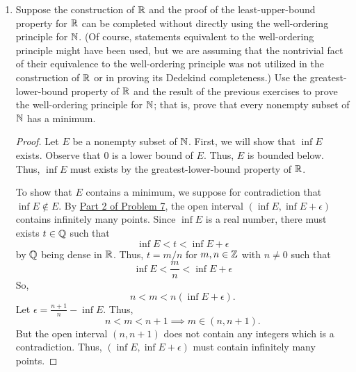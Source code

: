\documentclass[11pt,a4paper]{article}
\begin{document}
\begin{enumerate}
\begin{enumerate}
\begin{proof}
    Now, we will show, through contradiction, that \( (\inf B, \inf B + \epsilon) \cap B \) contains infinitely many points. Suppose there exists an \( \epsilon > 0  \) such that \( (\inf B, \inf B + \epsilon) \) FINITELY many points. Denote these points by \( {b}_{i}  \) for \( 1 \leq i \leq n  \) in
    \[  (\inf B, \inf B + \epsilon) \cap B = \{ {b}_{i} : 1 \leq i \leq n   \}  \]
    For all \( 1 \leq k \leq n  \), let \( {d}_{k } = | \inf B - {b}_{k } |  \). Since \( {b}_{k } \in B  \) and \( \inf B \notin  B  \), we must have \( | \inf B - {b}_{k } | > 0  \). Let 
    \[  d = \frac{ \min \{ {d}_{1}, {d}_{2}, \dots, {d}_{n} \}  }{ 2 }. \]
    But this implies that none of the \( {b}_{i} \) for \( 1 \leq i \leq n   \) lies within the open interval \( (\inf B , \inf B + \epsilon) \). That is, the set 
    \[  (\inf B , \inf B + \epsilon) \cap B = \emptyset \]
    which is a contradiction. Thus, the open interval \( (\inf B, \inf B + \epsilon) \) must have infinitely many points.
    \end{proof}
\end{enumerate}

\item Suppose the construction of \( \mathbb{R}  \) and the proof of the least-upper-bound property for \( \mathbb{R}  \) can be completed without directly using the well-ordering principle for \( \mathbb{N}  \). (Of course, statements equivalent to the well-ordering principle might have been used, but we are assuming that the nontrivial fact of their equivalence to the well-ordering principle was not utilized in the construction of \( \mathbb{R}  \) or in proving its Dedekind completeness.) Use the greatest-lower-bound property of \( \mathbb{R}  \) and the result of the previous exercises to prove the well-ordering principle for \( \mathbb{N}  \); that is, prove that every nonempty subset of \( \mathbb{N}  \) has a minimum.
    \begin{proof}
    Let \( E  \) be a nonempty subset of \( \mathbb{N}  \). First, we will show that \( \inf E  \) exists. Observe that \( 0  \) is a lower bound of \( E  \). Thus, \( E  \) is bounded below. Thus, \( \inf E  \) must exists by the greatest-lower-bound property of \( \mathbb{R}  \).    

    To show that \( E  \) contains a minimum, we suppose for contradiction that \( \inf E \notin E  \). By {\hyperref[Problem 2]{Part 2 of Problem 7}}, the open interval \( (\inf E, \inf E + \epsilon) \) contains infinitely many points. Since \( \inf E  \) is a real number, there must exists \( t \in \mathbb{Q}  \) such that    
    \[  \inf E < t < \inf E + \epsilon \]
    by \( \mathbb{Q}  \) being dense in \( \mathbb{R}  \).
    Thus, \( t = m / n  \) for \( m, n \in \mathbb{Z}  \) with \( n \neq 0  \) such that  
    \[  \inf E < \frac{ m }{ n }  < \inf E + \epsilon   \]
    So,
    \[ n < m <  n (\inf E + \epsilon). \]
    Let \( \epsilon = \frac{ n + 1 }{ n }  - \inf E  \). Thus,     
    \[  n < m < n + 1 \implies m \in (n, n +1).  \]
    But the open interval \( (n, n +1)  \) does not contain any integers which is a contradiction. Thus, \( (\inf E, \inf E + \epsilon) \) must contain infinitely many points.  
    \end{proof}


\end{enumerate}
\end{document}
